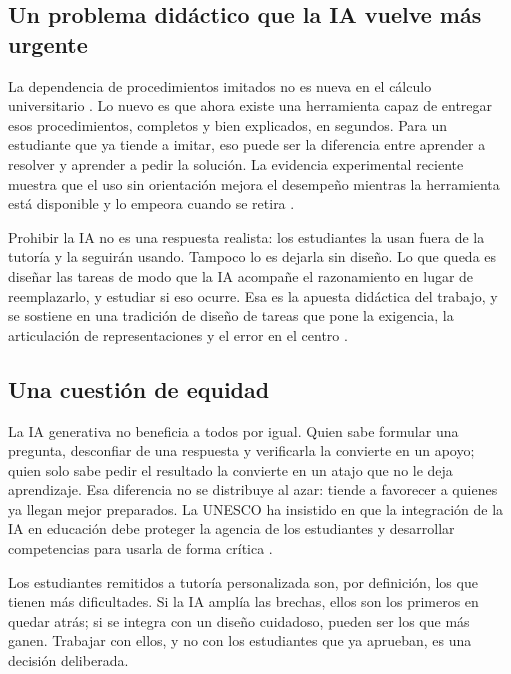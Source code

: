 \subsection*{Un problema didáctico que la IA vuelve más urgente}

La dependencia de procedimientos imitados no es nueva en el cálculo universitario \parencite{lithner2004reasoning,lithner2008framework}. Lo nuevo es que ahora existe una herramienta capaz de entregar esos procedimientos, completos y bien explicados, en segundos. Para un estudiante que ya tiende a imitar, eso puede ser la diferencia entre aprender a resolver y aprender a pedir la solución. La evidencia experimental reciente muestra que el uso sin orientación mejora el desempeño mientras la herramienta está disponible y lo empeora cuando se retira \parencite{bastani2025guardrails}.

Prohibir la IA no es una respuesta realista: los estudiantes la usan fuera de la tutoría y la seguirán usando. Tampoco lo es dejarla sin diseño. Lo que queda es diseñar las tareas de modo que la IA acompañe el razonamiento en lugar de reemplazarlo, y estudiar si eso ocurre. Esa es la apuesta didáctica del trabajo, y se sostiene en una tradición de diseño de tareas que pone la exigencia, la articulación de representaciones y el error en el centro \parencite{leungDesigningMathematicsTasks2015,radmehrTheoreticalFrameworkTask2023,vandebrouck2021task}.

\subsection*{Una cuestión de equidad}

La IA generativa no beneficia a todos por igual. Quien sabe formular una pregunta, desconfiar de una respuesta y verificarla la convierte en un apoyo; quien solo sabe pedir el resultado la convierte en un atajo que no le deja aprendizaje. Esa diferencia no se distribuye al azar: tiende a favorecer a quienes ya llegan mejor preparados. La UNESCO ha insistido en que la integración de la IA en educación debe proteger la agencia de los estudiantes y desarrollar competencias para usarla de forma crítica \parencite{unesco2023guia,unesco2024competencias}.

Los estudiantes remitidos a tutoría personalizada son, por definición, los que tienen más dificultades. Si la IA amplía las brechas, ellos son los primeros en quedar atrás; si se integra con un diseño cuidadoso, pueden ser los que más ganen. Trabajar con ellos, y no con los estudiantes que ya aprueban, es una decisión deliberada.

